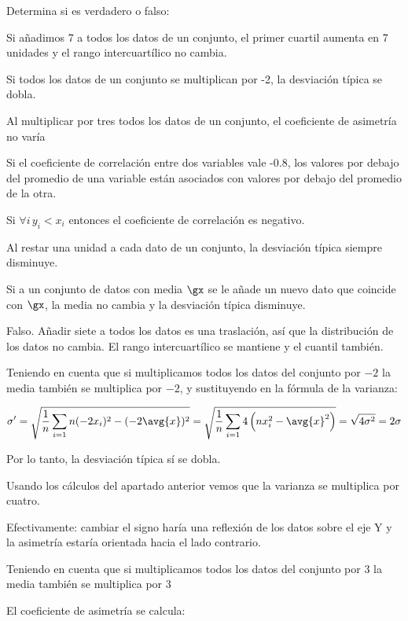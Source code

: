 \begin{problem}[5]Determina si es verdadero o falso:

\ppart Si añadimos 7 a todos los datos de un conjunto, el primer cuartil aumenta en 7 unidades y el rango intercuartílico no cambia.

\ppart Si todos los datos de un conjunto se multiplican por -2, la desviación típica se dobla.

\ppart Al multiplicar por tres todos los datos de un conjunto, el coeficiente de asimetría no varía

\ppart Si el coeficiente de correlación entre dos variables vale -0.8, los valores por debajo del
promedio de una variable están asociados con valores por debajo del promedio de la otra.

\ppart Si $\forall i\,y_i<x_i$ entonces el coeficiente de correlación es negativo.

\ppart Al restar una unidad a cada dato de un conjunto, la desviación típica siempre disminuye.

\ppart Si a un conjunto de datos con media $\gx$ se le añade un nuevo dato que coincide con $\gx$, la
media no cambia y la desviación típica disminuye.

\solution 

\spart Falso. Añadir siete a todos los datos es una traslación, así que la distribución de los datos no cambia. El rango intercuartílico se mantiene y el cuantil también.

\spart Teniendo en cuenta que si multiplicamos todos los datos del conjunto por $-2$ la media también se multiplica por $-2$, y sustituyendo en la fórmula de la varianza:

\[ \sigma' = \sqrt{\frac{1}{n} \sum_{i=1}n (-2x_i)^2 - (-2\avg{x})^2} = \sqrt{\frac{1}{n} \sum_{i=1}4\left(n x_i^2 - \avg{x}^2\right)} = \sqrt{4\sigma^2} = 2\sigma \]

Por lo tanto, la desviación típica sí se dobla.

\spart Usando los cálculos del apartado anterior vemos que la varianza se multiplica por cuatro.

\spart Efectivamente: cambiar el signo haría una reflexión de los datos sobre el eje Y y la asimetría estaría orientada hacia el lado contrario. 

\spart  Teniendo en cuenta que si multiplicamos todos los datos del conjunto por $3$ la media también se multiplica por $3$

El coeficiente de asimetría se calcula:


\end{problem}
